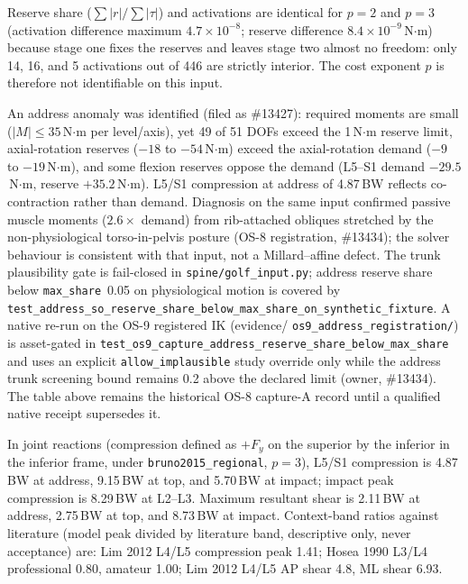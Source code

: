 Reserve share ($\sum|r|/\sum|\tau|$) and activations are identical for $p=2$ and
$p=3$ (activation difference maximum $4.7\times 10^{-8}$; reserve difference
$8.4\times 10^{-9}$\,N$\cdot$m) because stage one fixes the reserves and leaves
stage two almost no freedom: only 14, 16, and 5 activations out of 446 are
strictly interior. The cost exponent $p$ is therefore not identifiable on this input.

An address anomaly was identified (filed as \#13427): required moments are small
($|M|\le 35$\,N$\cdot$m per level/axis), yet 49 of 51 DOFs exceed the 1\,N$\cdot$m
reserve limit, axial-rotation reserves ($-18$ to $-54$\,N$\cdot$m) exceed the
axial-rotation demand ($-9$ to $-19$\,N$\cdot$m), and some flexion reserves oppose
the demand (L5--S1 demand $-29.5$\,N$\cdot$m, reserve $+35.2$\,N$\cdot$m).
L5/S1 compression at address of 4.87\,BW reflects co-contraction rather than
demand. Diagnosis on the same input confirmed passive muscle moments
($2.6\times$ demand) from rib-attached obliques stretched by the non-physiological
torso-in-pelvis posture (OS-8 registration, \#13434); the solver behaviour is
consistent with that input, not a Millard--affine defect. The trunk plausibility
gate is fail-closed in \texttt{spine/golf\_input.py}; address reserve share below
\texttt{max\_share}~0.05 on physiological motion is covered by
\texttt{test\_address\_so\_reserve\_share\_below\_max\_share\_on\_synthetic\_fixture}.
A native re-run on the OS-9 registered IK (evidence/
\texttt{os9\_address\_registration/}) is asset-gated in
\texttt{test\_os9\_capture\_address\_reserve\_share\_below\_max\_share} and uses an
explicit \texttt{allow\_implausible} study override only while the address trunk
screening bound remains 0.2\textdegree{} above the declared limit (owner, \#13434).
The table above remains the historical OS-8 capture-A record until a qualified
native receipt supersedes it.

In joint reactions (compression defined as $+F_y$ on the superior by the inferior
in the inferior frame, under \texttt{bruno2015\_regional}, $p=3$), L5/S1
compression is 4.87\,BW at address, 9.15\,BW at top, and 5.70\,BW at impact;
impact peak compression is 8.29\,BW at L2--L3. Maximum resultant shear is
2.11\,BW at address, 2.75\,BW at top, and 8.73\,BW at impact. Context-band ratios
against literature (model peak divided by literature band, descriptive only,
never acceptance) are: Lim 2012 L4/L5 compression peak 1.41; Hosea 1990 L3/L4
professional 0.80, amateur 1.00; Lim 2012 L4/L5 AP shear 4.8, ML shear 6.93.

